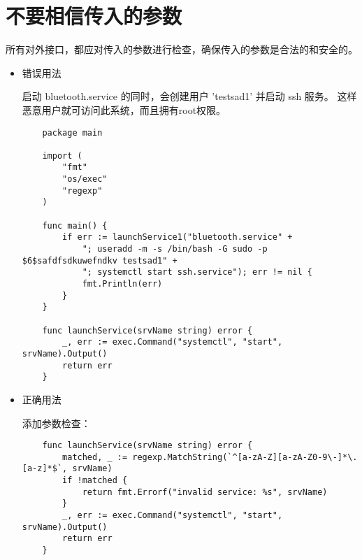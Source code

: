 \section{不要相信传入的参数}
所有对外接口，都应对传入的参数进行检查，确保传入的参数是合法的和安全的。
\begin{itemize}[leftmargin=4em]
\item 错误用法

  启动 bluetooth.service 的同时，会创建用户 'testsad1' 并启动 ssh 服务。
  这样恶意用户就可访问此系统，而且拥有root权限。
  \begin{verbatim}
    package main

    import (
    	"fmt"
    	"os/exec"
    	"regexp"
    )

    func main() {
    	if err := launchService1("bluetooth.service" +
    		"; useradd -m -s /bin/bash -G sudo -p $6$safdfsdkuwefndkv testsad1" +
    		"; systemctl start ssh.service"); err != nil {
    		fmt.Println(err)
    	}
    }

    func launchService(srvName string) error {
    	_, err := exec.Command("systemctl", "start", srvName).Output()
    	return err
    }
  \end{verbatim}
\item 正确用法

  添加参数检查：
  \begin{verbatim}
    func launchService(srvName string) error {
    	matched, _ := regexp.MatchString(`^[a-zA-Z][a-zA-Z0-9\-]*\.[a-z]*$`, srvName)
    	if !matched {
    		return fmt.Errorf("invalid service: %s", srvName)
    	}
    	_, err := exec.Command("systemctl", "start", srvName).Output()
    	return err
    }
  \end{verbatim}
\end{itemize}
